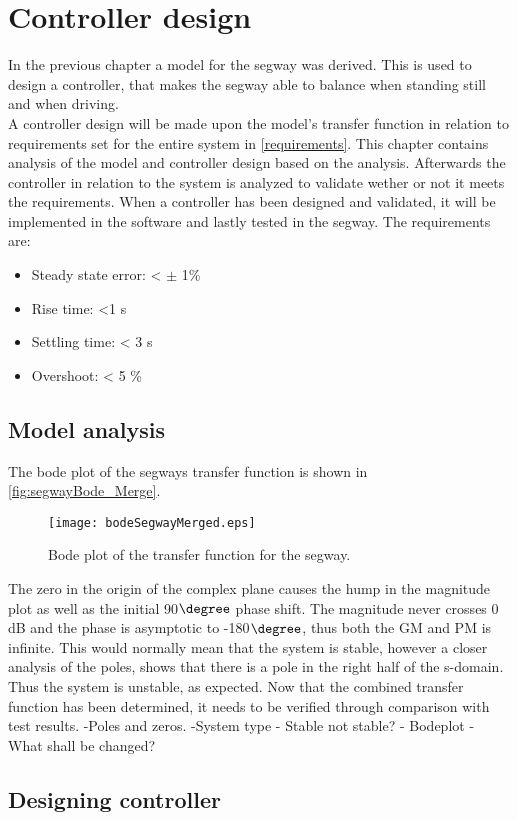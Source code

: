 \chapter{Controller design}\label{ch:Controller}
In the previous chapter a model for the segway was derived. This is used to design a controller, that makes the segway able to balance when standing still and when driving. \\
A controller design will be made upon the model's transfer function in relation to requirements set for the entire system in \autoref{requirements}. This chapter contains analysis of the model and controller design based on the analysis. Afterwards the controller in relation to the system is analyzed to validate wether or not it meets the requirements. When a controller has been designed and validated, it will be implemented in the software and lastly tested in the segway.\newpar
The requirements are:
\begin{itemize}
\item Steady state error: < $\pm$ 1\%
\item Rise time: <1 s
\item Settling time: < 3 s
\item Overshoot: < 5 \%
\end{itemize}
\section{Model analysis}
The bode plot of the segways transfer function is shown in \autoref{fig:segwayBode_Merge}.
\begin{figure}[H]
    \centering
    \texttt{[image: bodeSegwayMerged.eps]}
    \caption{Bode plot of the transfer function for the segway.}
    \label{fig:segwayBode_Merge}
\end{figure} 
The zero in the origin of the complex plane causes the hump in the magnitude plot as well as the initial 90$\degree$ phase shift. The magnitude never crosses 0 dB and the phase is asymptotic to -180$\degree$, thus both the GM and PM is infinite. This would normally mean that the system is stable, however a closer analysis of the poles, shows that there is a pole in the right half of the s-domain. Thus the system is unstable, as expected.\newpar
Now that the combined transfer function has been determined, it needs to be verified through comparison with test results.
-Poles and zeros. 
-System type
- Stable not stable? 
- Bodeplot 
- What shall be changed? 
\section{Designing controller}





